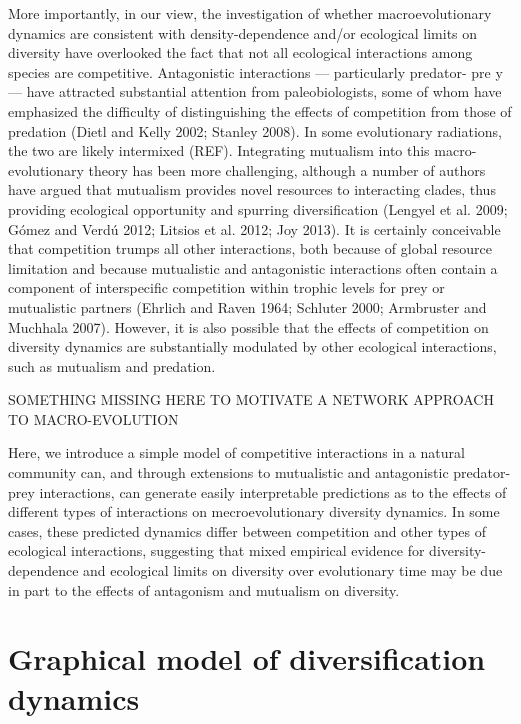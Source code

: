 \documentclass[12pt]{article}
\begin{document}
More importantly, in our view, the investigation of whether macroevolutionary
dynamics are consistent with density-dependence and/or ecological limits on
diversity have overlooked the fact that not all ecological interactions among
species are competitive. Antagonistic interactions — particularly predator-
pre y— have attracted substantial attention from paleobiologists, some of whom
have emphasized the difficulty of distinguishing the effects of competition
from those of predation (Dietl and Kelly 2002; Stanley 2008). In some
evolutionary radiations, the two are likely intermixed (REF). Integrating
mutualism into this macro-evolutionary theory has been more challenging,
although a number of authors have argued that mutualism provides novel
resources to interacting clades, thus providing ecological opportunity and
spurring diversification (Lengyel et al. 2009; Gómez and Verdú 2012; Litsios
et al. 2012; Joy 2013). It is certainly conceivable that competition trumps
all other interactions, both because of global resource limitation and because
mutualistic and antagonistic interactions often contain a component of
interspecific competition within trophic levels for prey or mutualistic
partners (Ehrlich and Raven 1964; Schluter 2000; Armbruster and Muchhala
2007). However, it is also possible that the effects of competition on
diversity dynamics are substantially modulated by other ecological
interactions, such as mutualism and predation.

SOMETHING MISSING HERE TO MOTIVATE A NETWORK APPROACH TO MACRO-EVOLUTION

Here, we introduce a simple model of competitive interactions in a natural
community can, and through extensions to mutualistic and antagonistic
predator-prey interactions, can generate easily interpretable predictions as
to the effects of different types of interactions on mecroevolutionary
diversity dynamics. In some cases, these predicted dynamics differ between
competition and other types of ecological interactions, suggesting that mixed
empirical evidence for diversity-dependence and ecological limits on diversity
over evolutionary time may be due in part to the effects of antagonism and
mutualism on diversity.

\section*{Graphical model of diversification dynamics}
\end{document}
